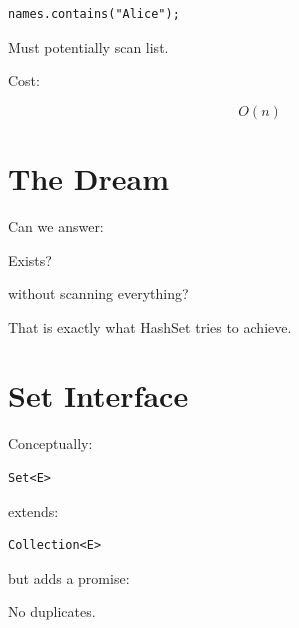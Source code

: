 \documentclass[11pt,a4paper]{book}
\begin{document}
\begin{verbatim} 
names.contains("Alice");
\end{verbatim}


Must potentially scan list.


Cost:

\[
O(n)
\]


\section{The Dream}

Can we answer:


Exists?


without scanning everything?


That is exactly what HashSet
tries to achieve.


\section{Set Interface}

Conceptually:

\begin{verbatim} 
Set<E>
\end{verbatim}


extends:

\begin{verbatim} 
Collection<E>
\end{verbatim}


but adds a promise:


No duplicates.
\end{document}
